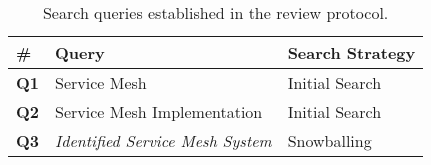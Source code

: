 \begin{table}[t]
\centering
    \begin{tabularx}{\linewidth}{lXl}
    \toprule
    \# & Query & Search Strategy \\
    
    \midrule
    \textbf{Q1} & Service Mesh & Initial Search \\
    \textbf{Q2} & Service Mesh Implementation & Initial Search \\

    \midrule
    \textbf{Q3} & \textit{Identified Service Mesh System} & Snowballing  \\
    
    \bottomrule
    \end{tabularx}
\caption{Search queries established in the review protocol.}
\label{tab:search-queries}
\end{table}

    

    
